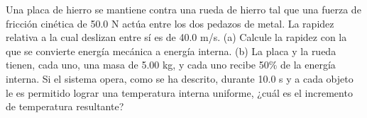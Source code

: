 \item Una placa de hierro se mantiene contra una rueda de hierro tal que una fuerza de fricción cinética de 50.0 N actúa entre los dos pedazos de metal. La rapidez relativa a la cual deslizan entre sí es de 40.0 m/s. (a) Calcule la rapidez con la que se convierte energía mecánica a energía interna. (b) La placa y la rueda tienen, cada uno, una masa de 5.00 kg, y cada uno recibe 50\% de la energía interna. Si el sistema opera, como se ha descrito, durante 10.0 s y a cada objeto le es permitido lograr una temperatura interna uniforme, ¿cuál es el incremento de temperatura resultante?
